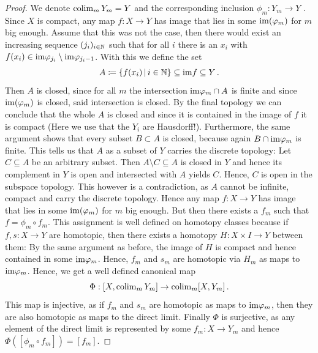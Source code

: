  \begin{proof}
	We denote $\operatorname{\mathrm{colim}}_mY_m=Y$ and the corresponding inclusion $\phi_m:Y_m\to Y$ . Since $X$ is compact, any map $f:X\to Y$ has image that lies in some $\mathrm{im}(\varphi_m)$ for $m$ big enough. Assume that this was not the case, then there would exist an increasing sequence $(j_i)_{i\in \mathbb{N}}$ such that for all $i$ there is an $x_i$ with $f(x_i)\in \mathrm{im} \varphi_{j_i}\setminus \mathrm{im} \varphi_{j_i-1}$. With this we define the set 
	\begin{equation*}
		A\coloneq \{f(x_i)\,|\, i\in \mathbb{N} \}\subseteq \mathrm{im} f \subseteq Y\,.
	\end{equation*}Then $A$ is closed, since for all $m$ the intersection $\mathrm{im}\varphi_m\cap A$ is finite and since $\mathrm{im}(\varphi_m)$ is closed, said intersection is closed. By the final topology we can conclude that the whole $A$ is closed and since it is contained in the image of $f$ it is compact (Here we use that the $Y_i$ are Hausdorff!). Furthermore, the same argument shows that every subset $B\subset A$ is closed, because again $B\cap \mathrm{im} \varphi_m$ is finite. This tells us that $A$ as a subset of $Y$ carries the discrete topology: Let $C\subseteq A$ be an arbitrary subset. Then $A\setminus C\subseteq A$ is closed in $Y$ and hence its complement in $Y$ is open and intersected with $A$ yields $C$. Hence, $C$ is open in the subspace topology. This however is a contradiction, as $A$ cannot be infinite, compact and carry the discrete topology.
	Hence any map $f:X\to Y$ has image that lies in some $\mathrm{im}(\varphi_m)$ for $m$ big enough. But then there exists a $f_m$ such that $f=\phi_m\circ f_m$.  This assignment is well defined on homotopy classes because if $f,s:X\to Y$ are homotopic, then there exists a homotopy $H:X\times I\to Y$ between them: By the same argument as before, the image of $H$ is compact and hence contained in some $\mathrm{im} \varphi_m$. Hence, $f_m$ and $s_m$ are homotopic via $H_m$ as maps to $\mathrm{im} \varphi_m$. Hence, we get a well defined canonical map 
\begin{equation*}
	\Phi: [X,\operatorname{\mathrm{colim}}_m Y_m] \to \operatorname{\mathrm{colim}}_m [X,Y_m]\,.
\end{equation*}This map is injective, as if $f_m$ and $s_m$ are homotopic as maps to $\mathrm{im}\varphi_m$, then they are also homotopic as maps to the direct limit. Finally $\Phi$ is surjective, as any element of the direct limit is represented by some $f_m:X\to Y_m$ and hence $\Phi([\phi_m\circ f_m])=[f_m]$. 
 \end{proof}
 
